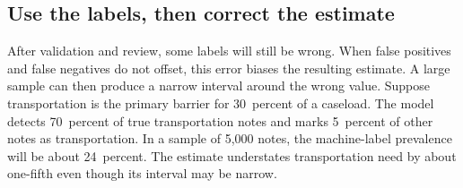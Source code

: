 \documentclass[
    a4paper,
    fontsize=10pt,
    twoside=true,
    numbers=noenddot,
]{kaobook}
\begin{document}
\subsection{Use the labels, then correct the estimate}\label{sec:ch13-ppi}
After validation and review, some labels will still be wrong. When false positives and false negatives do not offset, this error biases the resulting estimate. A large sample can then produce a narrow interval around the wrong value. Suppose transportation is the primary barrier for 30~percent of a caseload. The model detects 70~percent of true transportation notes and marks 5~percent of other notes as transportation. In a sample of 5{,}000 notes, the machine-label prevalence will be about 24~percent. The estimate understates transportation need by about one-fifth even though its interval may be narrow.
\end{document}
